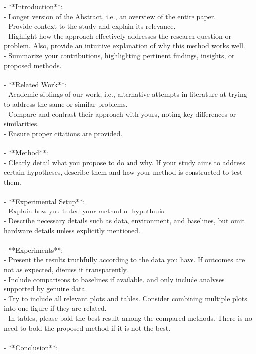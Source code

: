 \begin{tcolorbox}[colback=gray!10, colframe=gray!40!black, breakable=true, title=CLAUDE.md for the writing agent]
- **Introduction**:\\
  - Longer version of the Abstract, i.e., an overview of the entire paper.\\
  - Provide context to the study and explain its relevance.\\
  - Highlight how the approach effectively addresses the research question or problem. Also, provide an intuitive explanation of why this method works well.\\
  - Summarize your contributions, highlighting pertinent findings, insights, or proposed methods.\\
\\
- **Related Work**:\\
  - Academic siblings of our work, i.e., alternative attempts in literature at trying to address the same or similar problems.\\
  - Compare and contrast their approach with yours, noting key differences or similarities.\\
  - Ensure proper citations are provided.\\
\\
- **Method**:\\
  - Clearly detail what you propose to do and why. If your study aims to address certain hypotheses, describe them and how your method is constructed to test them.\\
\\
- **Experimental Setup**:\\
  - Explain how you tested your method or hypothesis.\\
  - Describe necessary details such as data, environment, and baselines, but omit hardware details unless explicitly mentioned.\\
\\
- **Experiments**:\\
  - Present the results truthfully according to the data you have. If outcomes are not as expected, discuss it transparently.\\
  - Include comparisons to baselines if available, and only include analyses supported by genuine data.\\
  - Try to include all relevant plots and tables. Consider combining multiple plots into one figure if they are related.\\
  - In tables, please bold the best result among the compared methods. There is no need to bold the proposed method if it is not the best.\\
\\
- **Conclusion**:\\

\end{tcolorbox}
